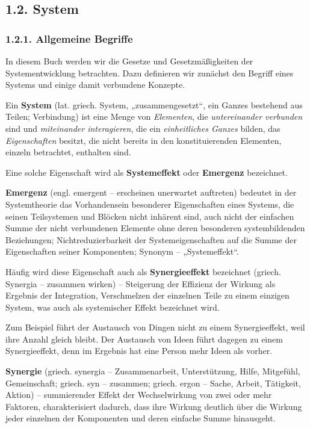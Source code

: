 \documentclass[11pt,a4paper]{article}
\begin{document}
\subsection*{1.2. System}
\subsubsection*{1.2.1. Allgemeine Begriffe}

In diesem Buch werden wir die Gesetze und Gesetzmäßigkeiten der
Systementwicklung betrachten.  Dazu definieren wir zunächst den Begriff eines
Systems und einige damit verbundene Konzepte.

Ein \textbf{System} (lat. griech. System, „zusammengesetzt“, ein Ganzes
bestehend aus Teilen; Verbindung) ist eine Menge von \emph{Elementen}, die
\emph{untereinander verbunden} sind und \emph{miteinander interagieren}, die
ein \emph{einheitliches Ganzes} bilden, das \emph{Eigenschaften} besitzt, die
nicht bereits in den konstituierenden Elementen, einzeln betrachtet, enthalten
sind.

Eine solche Eigenschaft wird als \textbf{Systemeffekt} oder \textbf{Emergenz}
bezeichnet.

\textbf{Emergenz} (engl. emergent -- erscheinen unerwartet auftreten) bedeutet
in der Systemtheorie das Vorhandensein besonderer Eigenschaften eines Systems,
die seinen Teilsystemen und Blöcken nicht inhärent sind, auch nicht der
einfachen Summe der nicht verbundenen Elemente ohne deren besonderen
systembildenden Beziehungen; Nichtreduzierbarkeit der Systemeigenschaften auf
die Summe der Eigenschaften seiner Komponenten; Synonym -- „Systemeffekt“.

Häufig wird diese Eigenschaft auch als \textbf{Synergieeffekt} bezeichnet
(griech. Synergia -- zusammen wirken) -- Steigerung der Effizienz der Wirkung
als Ergebnis der Integration, Verschmelzen der einzelnen Teile zu einem
einzigen System, was auch als systemischer Effekt bezeichnet wird.

Zum Beispiel führt der Austausch von Dingen nicht zu einem Synergieeffekt,
weil ihre Anzahl gleich bleibt. Der Austausch von Ideen führt dagegen zu einem
Synergieeffekt, denn im Ergebnis hat eine Person mehr Ideen als vorher.

\textbf{Synergie} (griech. synergia -- Zusammenarbeit, Unterstützung, Hilfe,
Mitgefühl, Gemeinschaft; griech. syn -- zusammen; griech. ergon -- Sache,
Arbeit, Tätigkeit, Aktion) -- summierender Effekt der Wechselwirkung von zwei
oder mehr Faktoren, charakterisiert dadurch, dass ihre Wirkung deutlich über
die Wirkung jeder einzelnen der Komponenten und deren einfache Summe
hinausgeht.
\end{document}
